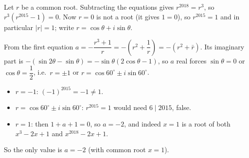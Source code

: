 Let $r$ be a common root. Subtracting the equations gives $r^{2018}=r^3$, so $r^3\left(r^{2015}-1\right)=0$. Now $r=0$ is not a root (it gives $1=0$), so $r^{2015}=1$ and in particular $|r|=1$; write $r=\cos\theta+i\sin\theta$.

From the first equation $a=-\dfrac{r^3+1}{r}=-\left(r^2+\dfrac{1}{r}\right)=-\left(r^2+\bar r\right)$. Its imaginary part is $-(\sin2\theta-\sin\theta)=-\sin\theta(2\cos\theta-1)$, so $a$ real forces $\sin\theta=0$ or $\cos\theta=\dfrac{1}{2}$, i.e.\ $r=\pm1$ or $r=\cos60^\circ\pm i\sin60^\circ$.
\begin{itemize}
\item $r=-1$: $(-1)^{2015}=-1\ne1$.
\item $r=\cos60^\circ\pm i\sin60^\circ$: $r^{2015}=1$ would need $6\mid2015$, false.
\item $r=1$: then $1+a+1=0$, so $a=-2$, and indeed $x=1$ is a root of both $x^3-2x+1$ and $x^{2018}-2x+1$.
\end{itemize}
So the only value is $\boxed{a=-2}$ (with common root $x=1$).

